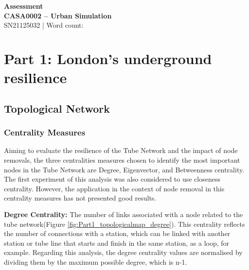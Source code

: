 \documentclass[10pt]{report}
\author{Felipe Santos Almeida}
\numberwithin{figure}{section}
\numberwithin{table}{section}
\begin{document}

\begin{center}
    \vspace*{-3cm}
\end{center}   
    {\LARGE\textbf{Assessment\\
    CASA0002 – Urban Simulation\\}}
SN21125032 | Word count: 

\vspace{5mm} %
  
\section{Part 1: London’s underground resilience}


 \subsection{Topological Network}
\subsubsection{Centrality Measures } 
        
         Aiming to evaluate the resilience of the Tube Network and the impact of node removals, the three centralities measures chosen to identify the most important nodes in the Tube Network are Degree, Eigenvector, and Betweenness centrality. The first experiment of this analysis was also considered to use closeness centrality. However, the application in the context of node removal in this centrality measures has not presented good results.  
        
        \vspace{5mm} %
        
        \textbf{Degree Centrality:} The number of links associated with a node related to the tube network(Figure \ref{fig:Part1_topologicalmap_degree}). This centrality reflects the number of connections with a station, which can be linked with another station or tube line that starts and finish in the same station, as a loop, for example. Regarding this analysis, the degree centrality values are normalised by dividing them by the maximum possible degree, which is n-1. 
\end{document}
